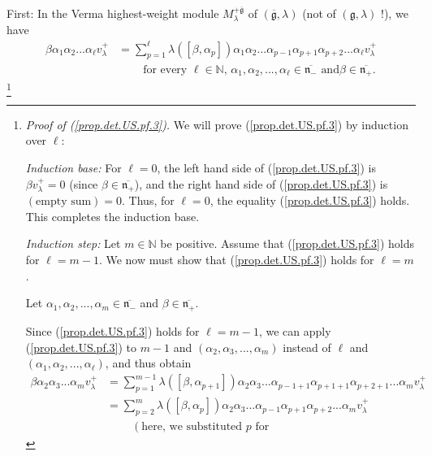 \documentclass
[numbers=enddot,12pt,final,onecolumn,german,notitlepage]{scrartcl}%
\theoremstyle{definition}
\begin{document}
First: In the Verma highest-weight module $M_{\lambda}^{+\overline
{\mathfrak{g}}}$ of $\left(  \overline{\mathfrak{g}},\lambda\right)  $ (not of
$\left(  \mathfrak{g},\lambda\right)  $ !), we have%
\begin{align}
\beta\alpha_{1}\alpha_{2}...\alpha_{\ell}v_{\lambda}^{+}  &  =\sum
\limits_{p=1}^{\ell}\lambda\left(  \left[  \beta,\alpha_{p}\right]  \right)
\alpha_{1}\alpha_{2}...\alpha_{p-1}\alpha_{p+1}\alpha_{p+2}...\alpha_{\ell
}v_{\lambda}^{+}\label{prop.det.US.pf.3}\\
&  \ \ \ \ \ \ \ \ \ \ \text{for every }\ell\in\mathbb{N}\text{, }\alpha
_{1},\alpha_{2},...,\alpha_{\ell}\in\overline{\mathfrak{n}_{-}}\text{ and
}\beta\in\overline{\mathfrak{n}_{+}}.\nonumber
\end{align}
\footnote{\textit{Proof of (\ref{prop.det.US.pf.3}).} We will prove
(\ref{prop.det.US.pf.3}) by induction over $\ell$:
\par
\textit{Induction base:} For $\ell=0$, the left hand side of
(\ref{prop.det.US.pf.3}) is $\beta v_{\lambda}^{+}=0$ (since $\beta
\in\overline{\mathfrak{n}_{+}}$), and the right hand side of
(\ref{prop.det.US.pf.3}) is $\left(  \text{empty sum}\right)  =0$. Thus, for
$\ell=0$, the equality (\ref{prop.det.US.pf.3}) holds. This completes the
induction base.
\par
\textit{Induction step:} Let $m\in\mathbb{N}$ be positive. Assume that
(\ref{prop.det.US.pf.3}) holds for $\ell=m-1$. We now must show that
(\ref{prop.det.US.pf.3}) holds for $\ell=m$.
\par
Let $\alpha_{1},\alpha_{2},...,\alpha_{m}\in\overline{\mathfrak{n}_{-}}$ and
$\beta\in\overline{\mathfrak{n}_{+}}$.
\par
Since (\ref{prop.det.US.pf.3}) holds for $\ell=m-1$, we can apply
(\ref{prop.det.US.pf.3}) to $m-1$ and $\left(  \alpha_{2},\alpha
_{3},...,\alpha_{m}\right)  $ instead of $\ell$ and $\left(  \alpha_{1}%
,\alpha_{2},...,\alpha_{\ell}\right)  $, and thus obtain%
\begin{align*}
\beta\alpha_{2}\alpha_{3}...\alpha_{m}v_{\lambda}^{+}  &  =\sum\limits_{p=1}%
^{m-1}\lambda\left(  \left[  \beta,\alpha_{p+1}\right]  \right)  \alpha
_{2}\alpha_{3}...\alpha_{p-1+1}\alpha_{p+1+1}\alpha_{p+2+1}...\alpha
_{m}v_{\lambda}^{+}\\
&  =\sum\limits_{p=2}^{m}\lambda\left(  \left[  \beta,\alpha_{p}\right]
\right)  \alpha_{2}\alpha_{3}...\alpha_{p-1}\alpha_{p+1}\alpha_{p+2}%
...\alpha_{m}v_{\lambda}^{+}\\
&  \ \ \ \ \ \ \ \ \ \ \left(  \text{here, we substituted }p\text{ for
}
\end{align*}}
\end{document}
